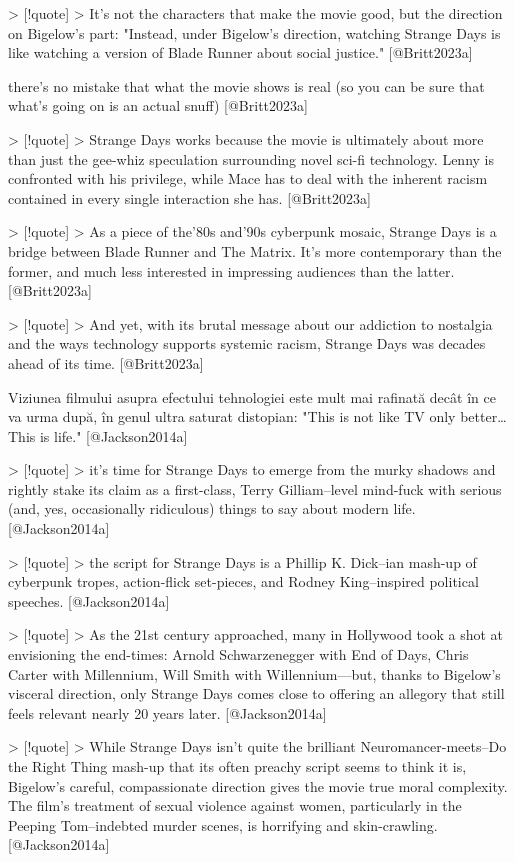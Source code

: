 \documentclass[a4paper, 12pt]{article}
\begin{document}
> [!quote]
> It's not the characters that make the movie good, but the direction on Bigelow's part: "Instead, under Bigelow’s direction, watching Strange Days is like watching a version of Blade Runner about social justice." [@Britt2023a]

there's no mistake that what the movie shows is real (so you can be sure that what's going on is an actual snuff) [@Britt2023a]

> [!quote]
> Strange Days works because the movie is ultimately about more than just the gee-whiz speculation surrounding novel sci-fi technology. Lenny is confronted with his privilege, while Mace has to deal with the inherent racism contained in every single interaction she has. [@Britt2023a]

> [!quote]
> As a piece of the’80s and’90s cyberpunk mosaic, Strange Days is a bridge between Blade Runner and The Matrix. It’s more contemporary than the former, and much less interested in impressing audiences than the latter. [@Britt2023a]

> [!quote]
> And yet, with its brutal message about our addiction to nostalgia and the ways technology supports systemic racism, Strange Days was decades ahead of its time. [@Britt2023a]

Viziunea filmului asupra efectului tehnologiei este mult mai rafinată decât în ce va urma după, în genul ultra saturat distopian: "This is not like TV only better… This is life." [@Jackson2014a]

> [!quote]
> it's time for Strange Days to emerge from the murky shadows and rightly stake its claim as a first-class, Terry Gilliam–level mind-fuck with serious (and, yes, occasionally ridiculous) things to say about modern life. [@Jackson2014a]

> [!quote]
> the script for Strange Days is a Phillip K. Dick–ian mash-up of cyberpunk tropes, action-flick set-pieces, and Rodney King–inspired political speeches. [@Jackson2014a]

> [!quote]
> As the 21st century approached, many in Hollywood took a shot at envisioning the end-times: Arnold Schwarzenegger with End of Days, Chris Carter with Millennium, Will Smith with Willennium—but, thanks to Bigelow's visceral direction, only Strange Days comes close to offering an allegory that still feels relevant nearly 20 years later. [@Jackson2014a]

> [!quote]
> While Strange Days isn't quite the brilliant Neuromancer-meets–Do the Right Thing mash-up that its often preachy script seems to think it is, Bigelow's careful, compassionate direction gives the movie true moral complexity. The film's treatment of sexual violence against women, particularly in the Peeping Tom–indebted murder scenes, is horrifying and skin-crawling. [@Jackson2014a]
\end{document}
